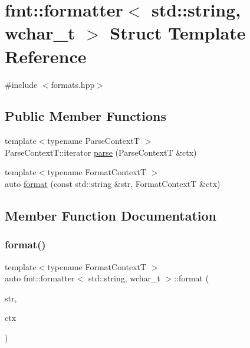 \hypertarget{structfmt_1_1formatter_3_01std_1_1string_00_01wchar__t_01_4}{}\section{fmt\+:\+:formatter$<$ std\+:\+:string, wchar\+\_\+t $>$ Struct Template Reference}
\label{structfmt_1_1formatter_3_01std_1_1string_00_01wchar__t_01_4}


{\ttfamily \#include $<$formats.\+hpp$>$}

\subsection*{Public Member Functions}
\begin{DoxyCompactItemize}
\item 
{\footnotesize template$<$typename Parse\+ContextT $>$ }\\Parse\+Context\+T\+::iterator \mbox{\hyperlink{structfmt_1_1formatter_3_01std_1_1string_00_01wchar__t_01_4_a893651c286fa63f0d3baa8bf45fec2b2}{parse}} (Parse\+ContextT \&ctx)
\item 
{\footnotesize template$<$typename Format\+ContextT $>$ }\\auto \mbox{\hyperlink{structfmt_1_1formatter_3_01std_1_1string_00_01wchar__t_01_4_a9814f539c9f55bdb9a54bf7f4387a8bb}{format}} (const std\+::string \&str, Format\+ContextT \&ctx)
\end{DoxyCompactItemize}


\subsection{Member Function Documentation}
\mbox{\label{structfmt_1_1formatter_3_01std_1_1string_00_01wchar__t_01_4_a9814f539c9f55bdb9a54bf7f4387a8bb}} 
\subsubsection{\texorpdfstring{format()}{format()}}
{\footnotesize\ttfamily template$<$typename Format\+ContextT $>$ \\
auto fmt\+::formatter$<$ std\+::string, wchar\+\_\+t $>$\+::format (\begin{DoxyParamCaption}\item[{const std\+::string \&}]{str,  }\item[{Format\+ContextT \&}]{ctx }\end{DoxyParamCaption})}

